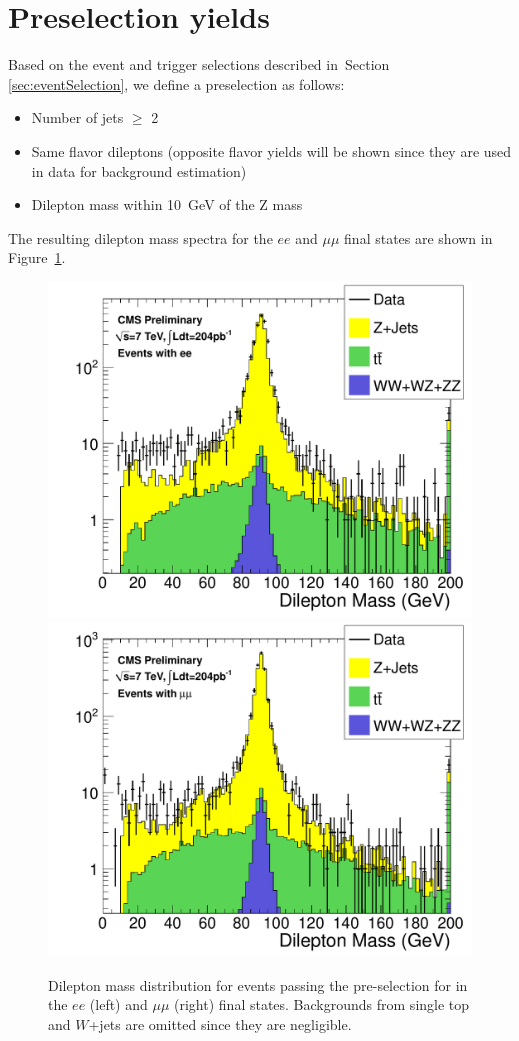 \section{Preselection yields}
\label{sec:yields}

Based on the event and trigger selections described in~Section \ref{sec:eventSelection}, 
we define a preselection as follows:
\begin{itemize}
\item Number of jets $\geq$ 2
\item Same flavor dileptons (opposite flavor yields will be shown since 
  they are used in data for \ttbar background estimation)
\item Dilepton mass within 10~GeV of the Z mass
\end{itemize}
The resulting dilepton mass spectra for the $ee$ and $\mu\mu$ final states are shown in Figure~\ref{fig:dilmass}.


\begin{figure}[hbt]
\begin{center}
\includegraphics[width=0.48\linewidth]{plots/hdilmass_ee_allj.pdf}
\includegraphics[width=0.48\linewidth]{plots/hdilmass_mm_allj.pdf}
\caption{\label{fig:dilmass}\protect Dilepton mass distribution for events passing the pre-selection for \lumi
  in the $ee$ (left) and $\mu\mu$ (right) final states. Backgrounds from single top and $W$+jets are omitted
  since they are negligible.}
\end{center}
\end{figure}



